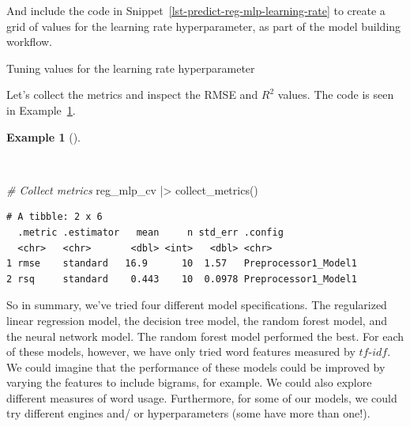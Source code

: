 \documentclass[
  letterpaper,
]{latex/krantz}
\newenvironment{Shaded}{\begin{snugshade}}{\end{snugshade}}
\newcommand{\AttributeTok}[1]{\textcolor[rgb]{0.00,0.00,0.00}{#1}}
\newcommand{\CommentTok}[1]{\textcolor[rgb]{0.00,0.00,0.00}{\textit{#1}}}
\newcommand{\DecValTok}[1]{\textcolor[rgb]{0.00,0.00,0.00}{#1}}
\newcommand{\FunctionTok}[1]{\textcolor[rgb]{0.00,0.00,0.00}{#1}}
\newcommand{\NormalTok}[1]{\textcolor[rgb]{0.00,0.00,0.00}{#1}}
\newcommand{\OtherTok}[1]{\textcolor[rgb]{0.00,0.00,0.00}{#1}}
\newcommand{\SpecialCharTok}[1]{\textcolor[rgb]{0.00,0.00,0.00}{#1}}
\theoremstyle{definition}
\newtheorem{example}{Example}[chapter]
\theoremstyle{remark}
\begin{document}
And include the code in Snippet~\ref{lst-predict-reg-mlp-learning-rate}
to create a grid of values for the learning rate hyperparameter, as part
of the model building workflow.

\begin{codelisting}

\caption{\label{lst-predict-reg-mlp-learning-rate}Tuning values for the
learning rate hyperparameter}

\centering{

\begin{Shaded}
\begin{Highlighting}[]
\NormalTok{reg\_grid }\OtherTok{\textless{}{-}}
  \FunctionTok{grid\_regular}\NormalTok{(}\FunctionTok{learn\_rate}\NormalTok{(), }\AttributeTok{levels =} \DecValTok{10}\NormalTok{)}
\end{Highlighting}
\end{Shaded}

}

\end{codelisting}%

Let's collect the metrics and inspect the RMSE and \(R^2\) values. The
code is seen in Example~\ref{exm-predict-reg-metrics-mlp}.

\begin{example}[]\protect\hypertarget{exm-predict-reg-metrics-mlp}{}\label{exm-predict-reg-metrics-mlp}

~

\begin{Shaded}
\begin{Highlighting}[]
\CommentTok{\# Collect metrics}
\NormalTok{reg\_mlp\_cv }\SpecialCharTok{|\textgreater{}} \FunctionTok{collect\_metrics}\NormalTok{()}
\end{Highlighting}
\end{Shaded}

\begin{verbatim}
# A tibble: 2 x 6
  .metric .estimator   mean     n std_err .config             
  <chr>   <chr>       <dbl> <int>   <dbl> <chr>               
1 rmse    standard   16.9      10  1.57   Preprocessor1_Model1
2 rsq     standard    0.443    10  0.0978 Preprocessor1_Model1
\end{verbatim}

\end{example}

So in summary, we've tried four different model specifications. The
regularized linear regression model, the decision tree model, the random
forest model, and the neural network model. The random forest model
performed the best. For each of these models, however, we have only
tried word features measured by \(tf\)-\(idf\). We could imagine that
the performance of these models could be improved by varying the
features to include bigrams, for example. We could also explore
different measures of word usage. Furthermore, for some of our models,
we could try different engines and/ or hyperparameters (some have more
than one!).
\end{document}
